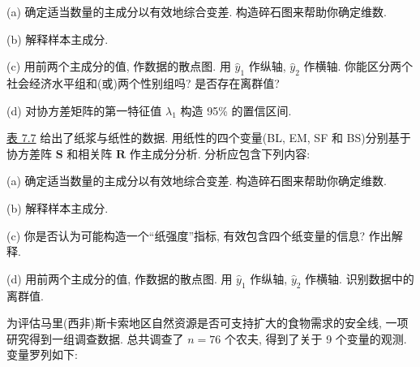 (a) 确定适当数量的主成分以有效地综合变差. 构造碎石图来帮助你确定维数.

(b) 解释样本主成分.

(c) 用前两个主成分的值, 作数据的散点图. 用 $\hat{y}_1$ 作纵轴, $\hat{y}_2$ 作横轴. 你能区分两个社会经济水平组和(或)两个性别组吗? 是否存在离群值?

(d) 对协方差矩阵的第一特征值 $\lambda_1$ 构造 95\% 的置信区间.

\quad \hyperref[tab:7.7]{表 7.7} 给出了纸浆与纸性的数据. 用纸性的四个变量(BL, EM, SF 和 BS)分别基于协方差阵 $\mathbf{S}$ 和相关阵 $\mathbf{R}$ 作主成分分析. 分析应包含下列内容:

(a) 确定适当数量的主成分以有效地综合变差. 构造碎石图来帮助你确定维数.

(b) 解释样本主成分.

(c) 你是否认为可能构造一个“纸强度”指标, 有效包含四个纸变量的信息? 作出解释.

(d) 用前两个主成分的值, 作数据的散点图. 用 $\hat{y}_1$ 作纵轴, $\hat{y}_2$ 作横轴. 识别数据中的离群值.

\quad 为评估马里(西非)斯卡索地区自然资源是否可支持扩大的食物需求的安全线, 一项研究得到一组调查数据. 总共调查了 $n=76$ 个农夫, 得到了关于 9 个变量的观测. 变量罗列如下:
